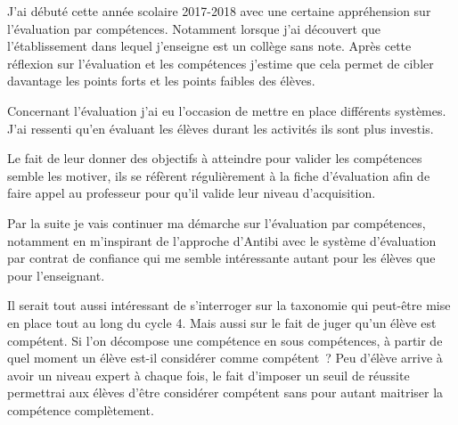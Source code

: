 
J'ai débuté cette année scolaire 2017-2018 avec une certaine appréhension sur l'évaluation par compétences.
Notamment lorsque j'ai découvert que l'établissement dans lequel j'enseigne est un collège sans note.
Après cette réflexion sur l'évaluation et les compétences j'estime que cela permet de cibler davantage les points forts et les points faibles des élèves.

Concernant l'évaluation j'ai eu l'occasion de mettre en place différents systèmes.
J'ai ressenti qu'en évaluant les élèves durant les activités ils sont plus investis.

Le fait de leur donner des objectifs à atteindre pour valider les compétences semble les motiver, ils se réfèrent régulièrement à la fiche d'évaluation afin de faire appel au professeur pour qu'il valide leur niveau d'acquisition.


Par la suite je vais continuer ma démarche sur l'évaluation par compétences, notamment en m'inspirant de l'approche d'Antibi avec le système d'évaluation par contrat de confiance qui me semble intéressante autant pour les élèves que pour l'enseignant. 

Il serait tout aussi intéressant de s'interroger sur la taxonomie qui peut-être mise en place tout au long du cycle 4.
Mais aussi sur le fait de juger qu'un élève est compétent.
Si l'on décompose une compétence en sous compétences, à partir de quel moment un élève est-il considérer comme compétent~?
Peu d'élève arrive à avoir un niveau expert à chaque fois, le fait d'imposer un seuil de réussite permettrai aux élèves d'être considérer compétent sans pour autant maitriser la compétence complètement.

